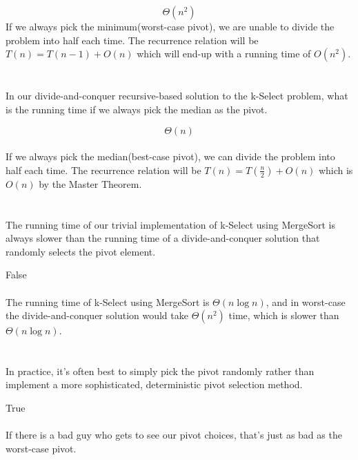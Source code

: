 \documentclass [12pt]{article}
\begin{document}
\begin{Solution}
$$\Theta(n^2)$$
If we always pick the minimum(worst-case pivot), we are unable to divide the problem into half each time. The recurrence relation will be $T(n) = T(n-1) + O(n)$ which will end-up with a running time of $O(n^2)$.
\end{Solution}


\section{} In our divide-and-conquer recursive-based solution to the k-Select problem, what is the running time if we always pick the median as the pivot.

\begin{Solution}
$$\Theta(n)$$
\paragraph{} 
If we always pick the median(best-case pivot), we can divide the problem into half each time. The recurrence relation will be $T(n) = T\left(\frac{n}{2}\right) + O(n)$ which is $O(n)$ by the Master Theorem.
\end{Solution}


\section{} The running time of our trivial implementation of k-Select using MergeSort is always slower than the running time of a divide-and-conquer solution that randomly selects the pivot element.

\begin{Solution}
False
\paragraph{} 
The running time of k-Select using MergeSort is $\Theta(n \log n)$, and in worst-case the divide-and-conquer solution would take $\Theta(n^2)$ time, which is slower than $\Theta(n \log n)$.
\end{Solution}


\section{} In practice, it's often best to simply pick the pivot randomly rather than implement a more sophisticated, deterministic pivot selection method.

\begin{Solution}
True
\paragraph{} 
If there is a bad guy who gets to see our pivot choices, that’s just as bad as the worst-case pivot.

\end{Solution}
\end{document}
